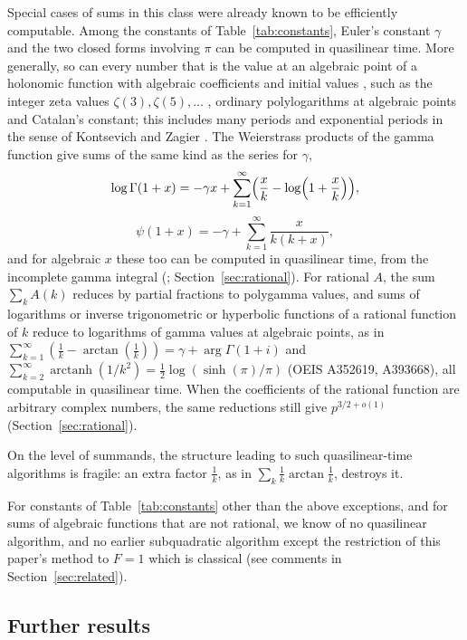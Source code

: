 \documentclass[11pt,reqno]{amsart}
\theoremstyle{definition}
\theoremstyle{remark}
\newcommand{\arctanh}{\operatorname{arctanh}}
\begin{document}
Special cases of sums in this class were already known to be efficiently computable.
Among the constants of Table~\ref{tab:constants},
Euler's constant $\gamma$ and the two closed forms involving $\pi$
can be computed in quasilinear time.
More generally, so can every number that is the value at an algebraic point of a holonomic function
with algebraic coefficients and initial values \cite{CC90,vdH99}, such as the integer zeta values $\zeta(3), \zeta(5),
\dots$ \cite{Kar95,Kar98}, ordinary polylogarithms at algebraic points and Catalan's constant; this includes many periods and
exponential periods in the sense of Kontsevich and Zagier \cite{KZ01}.
The Weierstrass products of the gamma function give sums of the same kind as the series for $\gamma$,
\[
  \log\Gamma(1+x) = -\gamma x + \sum_{k=1}^{\infty}\Bigl(\frac xk - \log\Bigl(1+\frac xk\Bigr)\Bigr),%
\]
\[
  \psi(1+x) = -\gamma + \sum_{k=1}^{\infty}\frac{x}{k(k+x)},
\]
and for algebraic $x$ these too can be computed in quasilinear time, from the incomplete gamma integral
(\cite{BZ10}; Section~\ref{sec:rational}).
For rational $A$, the sum $\sum_k A(k)$
reduces by partial fractions to polygamma values, and sums of logarithms or inverse trigonometric or hyperbolic
functions of a rational function of $k$ reduce to logarithms of gamma values at algebraic points, as in
$\sum_{k=1}^{\infty} (\frac1k - \arctan(\frac1k)) = \gamma + \arg\Gamma(1+i)$ and
$\sum_{k=2}^{\infty}\arctanh(1/k^2) = \tfrac{1}{2} \log(\sinh(\pi)/\pi)$
(OEIS A352619, A393668), all computable in quasilinear time. When the coefficients of the rational function are arbitrary complex numbers,
the same reductions still give $p^{3/2+o(1)}$ (Section~\ref{sec:rational}).

On the level of summands, the structure leading to such quasilinear-time algorithms is fragile:
an extra factor $\frac1k$, as in $\sum_k\frac1k\arctan\frac1k$, destroys it.

For constants of Table~\ref{tab:constants} other than the above exceptions, and for sums of
algebraic functions that are not rational, we know of no quasilinear
algorithm, and no earlier subquadratic algorithm
except the restriction of this paper's method to $F = 1$
which is classical (see comments in Section~\ref{sec:related}).

\subsection{Further results}
\end{document}
